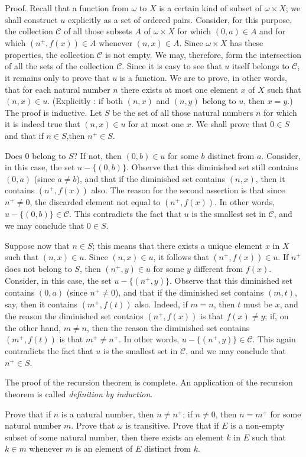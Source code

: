 Proof. Recall that a function from $\omega$ to $X$ is a certain kind of subset of $ \omega \times X$; we shall construct $u$ explicitly as a set of ordered  pairs. Consider, for this purpose, the collection $\mathcal{C}$ of all those subsets $A$ of $\omega \times X$ for which $(0, a) \in A$ and for which $(n^{+}, f(x)) \in A$ whenever $(n, x) \in A$. Since $ \omega \times X$ has these properties, the collection $\mathcal{C}$ is not empty. We may, therefore, form the intersection of all the sets of the collection $\mathcal{C}$. Since it is easy to see that $u$ itself belongs to $\mathcal{C}$, it remains only to prove that $u$ is a function. We are to prove, in other words, that for each natural number $n$ there exists at most one element $x$ of $X$ such that $(n, x) \in u$. (Explicitly : if both $(n, x)$ and $(n, y)$ belong to $u$, then $x = y$.) The proof is inductive. Let $S$ be the set of all those natural numbers $n$ for which it is indeed true that $(n, x) \in u$ for at most one $x$. We shall prove that $0 \in S$ and that if $n \in S$,then $n^{+} \in S$.

Does $0$ belong to $S$? If not, then $(0,b) \in u$ for some $b$ distinct from $a$. Consider, in this case, the set $u - \{ (0, b) \}$. Observe that this diminished set still contains $(0, a)$ (since $a \neq b$), and that if the diminished set contains $(n, x)$, then it contains $(n^{+}, f(x))$ also. The reason for the second assertion is that since $n^{+} \neq 0$, the discarded element not equal to $(n^{+}, f(x))$. In other words, $u - \{ (0, b) \} \in \mathcal{C}$. This contradicts the fact that $u$ is the smallest set in $\mathcal{C}$, and we may conclude that $0 \in S$. 

Suppose now that $n \in S$; this means that there exists a unique element $x$ in $X$ such that $(n, x) \in u$. Since $(n, x) \in u$, it follows that $(n^{+}, f(x)) \in u$. If $n^{+}$ does not belong to $S$, then $(n^{+}, y) \in u$ for some $y$ different from $f(x)$. Consider, in this case, the set $u - \{ (n^{+}, y) \}$. Observe that this diminished set contains $(0, a)$ (since $n^{+} \neq 0$), and that if the diminished set contains $(m, t)$, say, then it contains $(m^{+}, f(t))$ also. Indeed, if $m = n$, then $t$ must be $x$, and the reason the diminished set contains $(n^{+}, f(x))$ is that $f(x) \neq y$; if, on the other hand, $m \neq n$, then the reason the diminished set contains $(m^{+}, f(t))$ is that $m^{+} \neq n^{+}$. In other words, $u - \{ ( n^{+}, y) \} \in \mathcal{C}$. This again contradicts the fact that $u$ is the smallest set in $\mathcal{C}$, and we may conclude that $n^{+} \in S$. 

The proof of the recursion theorem is complete. An application of the recursion theorem is called \textit{definition by induction}. 

\begin{exercise} Prove that if $n$ is a natural number, then $n \neq n^{+}$; if $n \neq 0$, then $n = m^{+}$ for some natural number $m$. Prove that $ \omega $ is transitive. Prove that if $E$ is a non-empty subset of some natural number, then there exists an element $k$ in $E$ such that $k \in m$ whenever $m$ is an element of $E$ distinct from $k$.
\end{exercise}